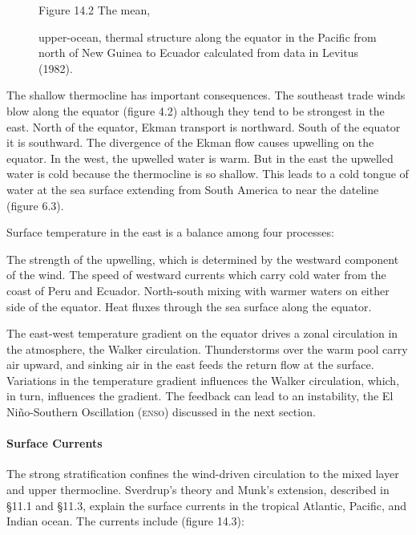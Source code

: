 \begin{figure}[t!]
\centering
{}
\footnotesize
Figure 14.2 The mean, \rule{0pt}{3ex}upper-ocean, thermal
structure along the equator in the Pacific from north of New Guinea to Ecuador
calculated from data in Levitus (1982).

\label{fig:equator}
\vspace{-2ex}
\end{figure}

The shallow thermocline has important consequences. The
southeast trade winds blow along the equator (figure 4.2) although they tend to be
strongest in the east. North of the equator, Ekman transport is northward. South of the equator it is southward. The
divergence of the Ekman flow causes upwelling on the equator. In
the west, the upwelled water is warm. But in the east the upwelled water is cold because the
thermocline is so shallow.  This leads to a cold tongue of water at the sea surface extending
from South America to near the dateline (figure 6.3).

Surface temperature in the east is a balance among four
processes:
\begin{enumerate}
\vitem The strength of the upwelling, which is determined by the
westward component of the wind.
\vitem The speed of westward currents which carry cold water from the coast of
Peru and Ecuador.
\vitem North-south mixing with warmer waters on either side of
the equator.
\vitem Heat fluxes through the sea surface along the equator.
\end{enumerate}

The east-west temperature gradient on the equator drives a zonal circulation
in the atmosphere, the Walker circulation. Thunderstorms over the warm pool
carry air upward, and sinking air in the east feeds the return flow at the
surface. Variations in the temperature gradient influences the Walker
circulation, which, in turn, influences the gradient. The feedback
can lead to an instability, the  El Ni\~{n}o-Southern Oscillation
(\textsc{enso}) discussed in the next section.

\paragraph{Surface Currents}
The strong stratification confines the
wind-driven circulation to the mixed layer and upper
thermocline. Sverdrup's theory and Munk's extension, described in
\S11.1 and \S11.3, explain the surface currents in the tropical Atlantic, Pacific, and Indian
ocean. The currents include (figure 14.3):

